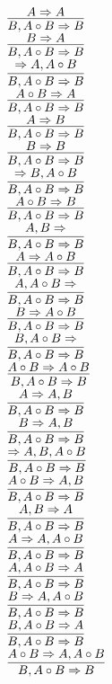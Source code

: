 \documentclass[11pt]{article}
\begin{document}
\begin{center}
\bigskip
\\$\infer{B, A\circ B\Rightarrow B}{A\Rightarrow A}$
\bigskip
\\$\infer{B, A\circ B\Rightarrow B}{B\Rightarrow A}$
\bigskip
\\$\infer{B, A\circ B\Rightarrow B}{\Rightarrow A, A\circ B}$
\bigskip
\\$\infer{B, A\circ B\Rightarrow B}{A\circ B\Rightarrow A}$
\bigskip
\\$\infer{B, A\circ B\Rightarrow B}{A\Rightarrow B}$
\bigskip
\\$\infer{B, A\circ B\Rightarrow B}{B\Rightarrow B}$
\bigskip
\\$\infer{B, A\circ B\Rightarrow B}{\Rightarrow B, A\circ B}$
\bigskip
\\$\infer{B, A\circ B\Rightarrow B}{A\circ B\Rightarrow B}$
\bigskip
\\$\infer{B, A\circ B\Rightarrow B}{A, B\Rightarrow }$
\bigskip
\\$\infer{B, A\circ B\Rightarrow B}{A\Rightarrow A\circ B}$
\bigskip
\\$\infer{B, A\circ B\Rightarrow B}{A, A\circ B\Rightarrow }$
\bigskip
\\$\infer{B, A\circ B\Rightarrow B}{B\Rightarrow A\circ B}$
\bigskip
\\$\infer{B, A\circ B\Rightarrow B}{B, A\circ B\Rightarrow }$
\bigskip
\\$\infer{B, A\circ B\Rightarrow B}{A\circ B\Rightarrow A\circ B}$
\bigskip
\\$\infer{B, A\circ B\Rightarrow B}{A\Rightarrow A, B}$
\bigskip
\\$\infer{B, A\circ B\Rightarrow B}{B\Rightarrow A, B}$
\bigskip
\\$\infer{B, A\circ B\Rightarrow B}{\Rightarrow A, B, A\circ B}$
\bigskip
\\$\infer{B, A\circ B\Rightarrow B}{A\circ B\Rightarrow A, B}$
\bigskip
\\$\infer{B, A\circ B\Rightarrow B}{A, B\Rightarrow A}$
\bigskip
\\$\infer{B, A\circ B\Rightarrow B}{A\Rightarrow A, A\circ B}$
\bigskip
\\$\infer{B, A\circ B\Rightarrow B}{A, A\circ B\Rightarrow A}$
\bigskip
\\$\infer{B, A\circ B\Rightarrow B}{B\Rightarrow A, A\circ B}$
\bigskip
\\$\infer{B, A\circ B\Rightarrow B}{B, A\circ B\Rightarrow A}$
\bigskip
\\$\infer{B, A\circ B\Rightarrow B}{A\circ B\Rightarrow A, A\circ B}$

\end{center}
\end{document}

